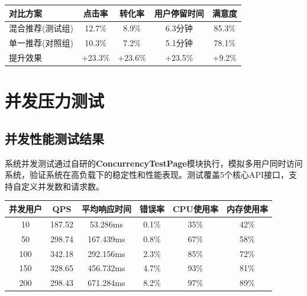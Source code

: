 \documentclass[12pt,a4paper]{article}
\begin{document}
\begin{table}[H]
\centering
\begin{tcolorbox}[
    colback=light,
    colframe=secondary,
    title={\textbf{推荐算法效果对比}},
    coltitle=white,
    colbacktitle=secondary,
    fonttitle=\bfseries,
    rounded corners=5pt,
    width=0.9\textwidth
]
\begin{tabular}{lcccc}
\toprule
\rowcolor{secondary!20}
\textbf{对比方案} & \textbf{点击率} & \textbf{转化率} & \textbf{用户停留时间} & \textbf{满意度} \\
\midrule
混合推荐(测试组) & 12.7\% & 8.9\% & 6.3分钟 & 85.3\% \\
\rowcolor{light}
单一推荐(对照组) & 10.3\% & 7.2\% & 5.1分钟 & 78.1\% \\
提升效果 & +23.3\% & +23.6\% & +23.5\% & +9.2\% \\
\bottomrule
\end{tabular}
\end{tcolorbox}
\end{table}

\section{并发压力测试}

\subsection{并发性能测试结果}

\begin{infobox}[title={并发测试说明}]
系统并发测试通过自研的\textbf{ConcurrencyTestPage}模块执行，模拟多用户同时访问系统，验证系统在高负载下的稳定性和性能表现。测试覆盖5个核心API接口，支持自定义并发数和请求数。
\end{infobox}

\begin{table}[H]
\centering
\begin{tcolorbox}[
    colback=light,
    colframe=danger,
    title={\textbf{并发压力测试结果}},
    coltitle=white,
    colbacktitle=danger,
    fonttitle=\bfseries,
    rounded corners=5pt,
    width=0.95\textwidth
]
\begin{tabular}{cccccc}
\toprule
\rowcolor{danger!20}
\textbf{并发用户} & \textbf{QPS} & \textbf{平均响应时间} & \textbf{错误率} & \textbf{CPU使用率} & \textbf{内存使用率} \\
\midrule
10 & 187.52 & 53.286ms & 0.1\% & 35\% & 42\% \\
\rowcolor{light}
50 & 298.74 & 167.439ms & 0.8\% & 67\% & 58\% \\
100 & 342.18 & 292.156ms & 2.3\% & 85\% & 72\% \\
\rowcolor{light}
150 & 328.65 & 456.732ms & 4.7\% & 93\% & 81\% \\
200 & 298.43 & 671.284ms & 8.2\% & 97\% & 89\% \\
\bottomrule
\end{tabular}
\end{tcolorbox}
\end{table}
\end{document}
